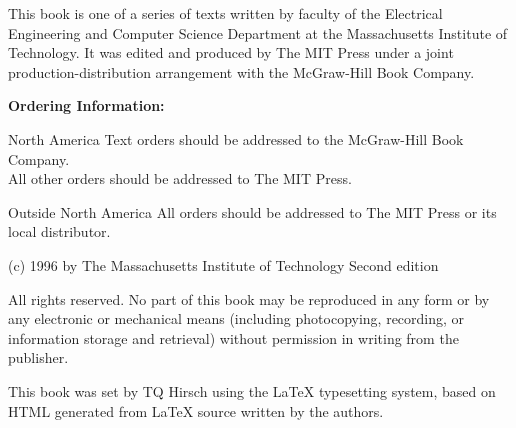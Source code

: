 \frontmatter
This book is one of a series of texts written by faculty of the
Electrical Engineering and Computer Science Department at the
Massachusetts Institute of Technology.  It was edited and produced by
The MIT Press under a joint production-distribution arrangement with
the McGraw-Hill Book Company.

\textbf{Ordering Information:}
\begin{description}
\item{North America}
  Text orders should be addressed to the McGraw-Hill Book Company.\\
  All other orders should be addressed to The MIT Press.
\item{Outside North America}
  All orders should be addressed to The MIT Press or its local distributor.
\end{description}

(c) 1996 by The Massachusetts Institute of Technology\hfill\newline{}
Second edition

All rights reserved.  No part of this book may be reproduced in any
form or by any electronic or mechanical means (including photocopying,
recording, or information storage and retrieval) without permission in
writing from the publisher.

This book was set by TQ Hirsch using the \LaTeX{} typesetting system,
based on HTML generated from \LaTeX{} source written by the authors.


